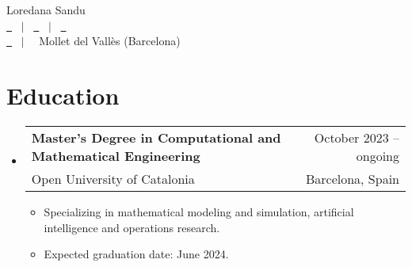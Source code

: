 \documentclass[a4paper,10pt]{article}
\makeatletter
\newcommand{\resumeQuadHeading}[4]{
  \item
  \begin{tabular*}{0.96\textwidth}[t]{l@{\extracolsep{\fill}}r}
    \textbf{#1} & \small #2 \\
    \small#3 & \small #4 \\
  \end{tabular*}
}
\newcommand{\resumeHeadingListStart}{
  \begin{itemize}[leftmargin=0.15in, label={}]
}
\newcommand{\resumeHeadingListEnd}{\end{itemize}}
\makeatother
\begin{document}
\begin{center}
    {\Huge Loredana Sandu } \\[1.2pc]
    \href{https://loredanasandu.github.io/}{\faLink \ } \, $|$ \, %
    \href{https://www.linkedin.com/in/loredana-sandu/}{\faLinkedinSquare \ } \, $|$ \, %
    \href{https://www.github.com/loredanasandu}{\faGithub \ } \\[0.1pc] %
    \href{mailto:loredana-sandu@uoc.edu}{\faEnvelope \ } \, $|$ \, %
    \faHome \ Mollet del Vallès (Barcelona) \\[1.5pc] %
\end{center}





\section{Education}
  \resumeHeadingListStart{}
  \resumeQuadHeading{Master's Degree in Computational and Mathematical Engineering}{October 2023 – ongoing}
  {Open University of Catalonia}{Barcelona, Spain}
  \begin{itemize}[leftmargin=3em, itemsep=0.1em, topsep=2pt]
      \item \small Specializing in mathematical modeling and simulation, artificial intelligence and operations research.
      \item \small Expected graduation date: June 2024.
  \end{itemize}
  \resumeHeadingListEnd{}
\end{document}
